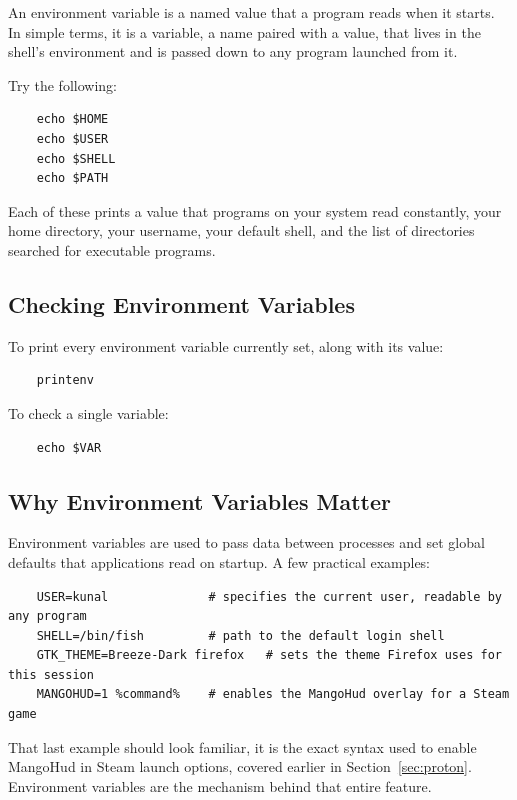 \documentclass{article}
\begin{document}
An environment variable is a named value that a program reads when it starts.
In simple terms, it is a variable, a name paired with a value, that lives in the shell's environment and is passed down to any program launched from it.

Try the following:

\begin{verbatim}
	echo $HOME
	echo $USER
	echo $SHELL
	echo $PATH
\end{verbatim}

\noindent Each of these prints a value that programs on your system read
constantly, your home directory, your username, your default shell, and the
list of directories searched for executable programs.

\subsection{Checking Environment Variables}

To print every environment variable currently set, along with its value:

\begin{verbatim}
	printenv
\end{verbatim}

To check a single variable:

\begin{verbatim}
	echo $VAR
\end{verbatim}

\subsection{Why Environment Variables Matter}

Environment variables are used to pass data between processes and set global
defaults that applications read on startup. A few practical examples:

\begin{verbatim}
	USER=kunal              # specifies the current user, readable by any program
	SHELL=/bin/fish         # path to the default login shell
	GTK_THEME=Breeze-Dark firefox   # sets the theme Firefox uses for this session
	MANGOHUD=1 %command%    # enables the MangoHud overlay for a Steam game
\end{verbatim}

\noindent That last example should look familiar, it is the exact syntax used to enable MangoHud in Steam launch options, covered earlier in Section~\ref{sec:proton}. Environment variables are the mechanism behind that
entire feature.
\end{document}
